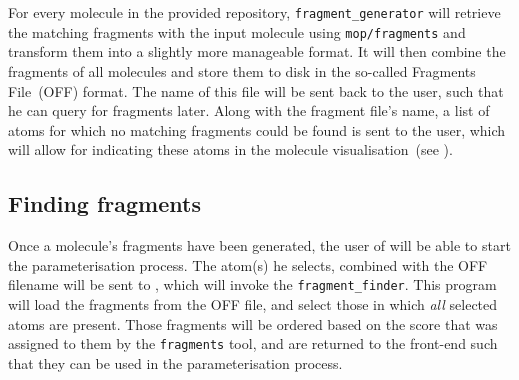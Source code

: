 For every molecule in the provided repository, \verb|fragment_generator| will retrieve the matching fragments with the input molecule using \verb|mop/fragments| and transform them into a slightly more manageable format. It will then combine the fragments of all molecules and store them to disk in the so-called \omfraf{} Fragments File~(OFF) format. The name of this file will be sent back to the \oframp{} user, such that he can query for fragments later. Along with the fragment file's name, a list of atoms for which no matching fragments could be found is sent to the user, which will allow for indicating these atoms in the molecule visualisation~(see ).


\subsection{Finding fragments}
Once a molecule's fragments have been generated, the user of \oframp{} will be able to start the parameterisation process. The atom(s) he selects, combined with the OFF filename will be sent to \omfraf, which will invoke the \verb|fragment_finder|. This program will load the fragments from the OFF file, and select those in which \emph{all} selected atoms are present. Those fragments will be ordered based on the score that was assigned to them by the \verb|fragments| tool, and are returned to the \oframp{} front-end such that they can be used in the parameterisation process.
